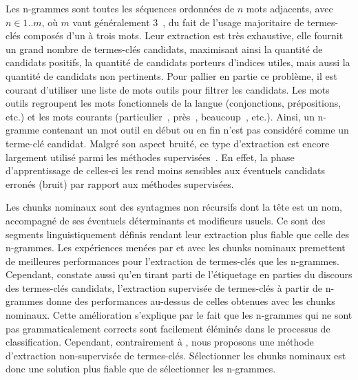     Les n-grammes sont toutes les séquences ordonnées de $n$ mots adjacents,
    avec $n \in 1..m$, où $m$ vaut généralement
    3~\cite{witten1999kea,turney1999learningalgorithms,hulth2003keywordextraction},
    du fait de l'usage majoritaire de termes-clés composés d'un à trois mots.
    Leur extraction est très exhaustive, elle fournit un grand nombre de
    termes-clés candidats, maximisant ainsi la quantité de candidats positifs,
    la quantité de candidats porteurs d'indices utiles, mais aussi la quantité
    de candidats non pertinents. Pour pallier en partie ce problème, il est
    courant d'utiliser une liste de mots outils pour filtrer les candidats. Les
    mots outils regroupent les mots fonctionnels de la langue (conjonctions,
    prépositions, etc.) et les mots courants (\og particulier~\fg, \og près~\fg,
    \og beaucoup~\fg, etc.). Ainsi, un n-gramme contenant un mot outil en début
    ou en fin n'est pas considéré comme un terme-clé candidat. Malgré son aspect
    bruité, ce type d'extraction est encore largement utilisé parmi les méthodes
    supervisées~\cite{witten1999kea,turney1999learningalgorithms,hulth2003keywordextraction}.
    En effet, la phase d'apprentissage de celles-ci les rend moins sensibles aux
    éventuels candidats erronés (bruit) par rapport aux méthodes supervisées.


    Les chunks nominaux sont des syntagmes non récursifs dont la tête est un
    nom, accompagné de ses éventuels déterminants et modifieurs usuels. Ce sont
    des segments linguistiquement définis rendant leur extraction plus fiable
    que celle des n-grammes. Les expériences menées par
     et  avec les
    chunks nominaux premettent de meilleures performances  pour l'extraction de
    termes-clés que les n-grammes. Cependant,
     constate aussi qu'en tirant parti de
    l'étiquetage en parties du discours des termes-clés candidats, l'extraction
    supervisée de termes-clés à partir de n-grammes donne des performances
    au-dessus de celles obtenues avec les chunks nominaux. Cette amélioration
    s'explique par le fait que les n-grammes qui ne sont pas grammaticalement
    corrects sont facilement éléminés dans le processus de classification.
    Cependant, contrairement à , nous
    proposons une méthode d'extraction non-supervisée de termes-clés.
    Sélectionner les chunks nominaux est donc une solution plus fiable que de
    sélectionner les n-grammes.

